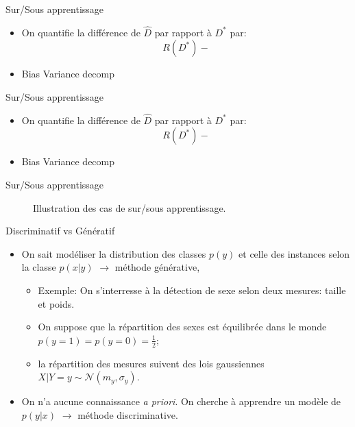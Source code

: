 \documentclass[8pt]{beamer}
\begin{document}
			\begin{frame}{Sur/Sous apprentissage}
				\begin{itemize}
					\item<1-> On quantifie la différence de \(\widehat D \) par rapport à \(D^*\) par:
						\begin{equation}
							R(D^*) - 
						\end{equation}
					\item<2-> Bias Variance decomp
				\end{itemize}
			\end{frame}
			\begin{frame}{Sur/Sous apprentissage}
				\begin{itemize}
					\item<1-> On quantifie la différence de \(\widehat D \) par rapport à \(D^*\) par:
						\begin{equation}
							R(D^*) - 
						\end{equation}
					\item<2-> Bias Variance decomp
				\end{itemize}
			\end{frame}
			\begin{frame}{Sur/Sous apprentissage}
				\begin{figure}[H]
					
					\caption*{Illustration des cas de sur/sous apprentissage.}
				\end{figure}
			\end{frame}
			\begin{frame}{Discriminatif vs Génératif}
				\begin{itemize}
					\item<1-> On sait modéliser la distribution des classes $p(y)$ et celle des instances selon la classe $p(x\vert y)$ $\longrightarrow$ méthode générative,
						\begin{itemize}
							\item<2-> Exemple: On s'interresse à la détection de sexe selon deux mesures: taille et poids.
							\item<3-> On suppose que la répartition des sexes est équilibrée dans le monde $p(y=1) = p(y=0) = \frac{1}{2}$;
							\item<4-> la répartition des mesures suivent des lois gaussiennes $X\vert Y=y \sim \mathscr{N}(m_y, \sigma_y)$.
						\end{itemize}
					\item<5-> On n'a aucune connaissance \textit{a priori}. On cherche à apprendre un modèle de $p(y \vert x)$ $\longrightarrow$ méthode discriminative.
				\end{itemize}
			\end{frame}	
\end{document}

